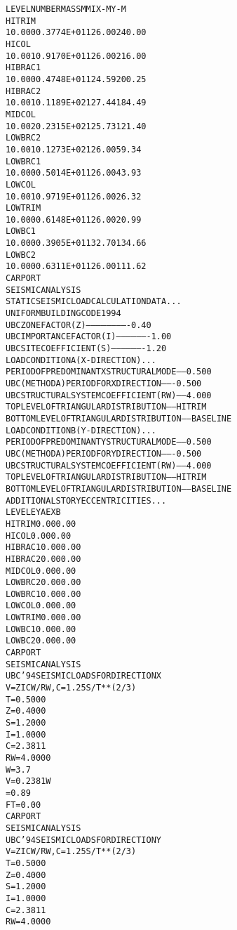 \documentclass[12pt,notitle,letterpaper]{report}
\renewenvironment{quote}
  {\small\list{}{\rightmargin=0cm \leftmargin=0cm}%
   \item\relax}
  {\endlist}
\begin{document}
\begin{quote}
\begin{alltt}
LEVEL        NUMBER        MASS         MMI         X-M         Y-M
HITRIM
                  1       0.000  0.3774E+01      126.00      240.00
HICOL
                  1       0.001  0.9170E+01      126.00      216.00
HIBRAC1
                  1       0.000  0.4748E+01      124.59      200.25
HIBRAC2
                  1       0.001  0.1189E+02      127.44      184.49
MIDCOL
                  1       0.002  0.2315E+02      125.73      121.40
LOWBRC2
                  1       0.001  0.1273E+02      126.00       59.34
LOWBRC1
                  1       0.000  0.5014E+01      126.00       43.93
LOWCOL
                  1       0.001  0.9719E+01      126.00       26.32
LOWTRIM
                  1       0.000  0.6148E+01      126.00       20.99
LOWBC1
                  1       0.000  0.3905E+01      132.70      134.66
LOWBC2
                  1       0.000  0.6311E+01      126.00      111.62
CARPORT
SEISMIC ANALYSIS
STATIC SEISMIC LOAD CALCULATION DATA . . .
UNIFORM BUILDING CODE 1994
UBC ZONE FACTOR (Z)-------------------------      0.40
UBC IMPORTANCE FACTOR (I)-------------------      1.00
UBC SITE COEFFICIENT (S) -------------------      1.20
LOAD CONDITION A (X-DIRECTION) . . .
PERIOD OF PREDOMINANT X STRUCTURAL MODE-----     0.500
UBC (METHOD A) PERIOD FOR X DIRECTION-------     0.500
UBC STRUCTURAL SYSTEM COEFFICIENT (RW)------     4.000
TOP    LEVEL OF TRIANGULAR DISTRIBUTION-----  HITRIM
BOTTOM LEVEL OF TRIANGULAR DISTRIBUTION-----  BASELINE
LOAD CONDITION B (Y-DIRECTION) . . .
PERIOD OF PREDOMINANT Y STRUCTURAL MODE-----     0.500
UBC (METHOD A) PERIOD FOR Y DIRECTION-------     0.500
UBC STRUCTURAL SYSTEM COEFFICIENT (RW)------     4.000
TOP    LEVEL OF TRIANGULAR DISTRIBUTION-----  HITRIM
BOTTOM LEVEL OF TRIANGULAR DISTRIBUTION-----  BASELINE
ADDITIONAL STORY ECCENTRICITIES . . .
LEVEL           EYA        EXB
HITRIM         0.00       0.00
HICOL          0.00       0.00
HIBRAC1        0.00       0.00
HIBRAC2        0.00       0.00
MIDCOL         0.00       0.00
LOWBRC2        0.00       0.00
LOWBRC1        0.00       0.00
LOWCOL         0.00       0.00
LOWTRIM        0.00       0.00
LOWBC1         0.00       0.00
LOWBC2         0.00       0.00
CARPORT
SEISMIC ANALYSIS
UBC '94 SEISMIC LOADS FOR DIRECTION   X
V = ZICW/RW,   C = 1.25S/T**(2/3)
T =    0.5000
Z =    0.4000
S =    1.2000
I =    1.0000
C =    2.3811
RW=    4.0000
W =       3.7
V =    0.2381W
   =      0.89
FT=      0.00
CARPORT
SEISMIC ANALYSIS
UBC '94 SEISMIC LOADS FOR DIRECTION   Y
V = ZICW/RW,   C = 1.25S/T**(2/3)
T =    0.5000
Z =    0.4000
S =    1.2000
I =    1.0000
C =    2.3811
RW=    4.0000

\end{alltt}
\end{quote}
\end{document}
